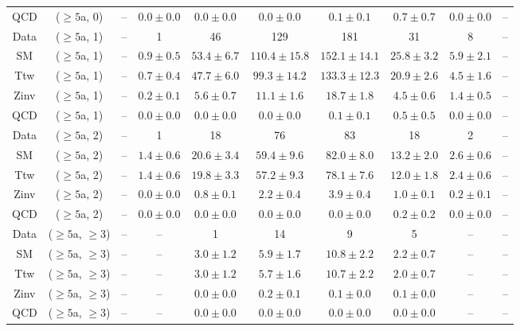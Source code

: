 \begin{table}[h!]
{\begin{tabular}{cccccccccc}
	QCD & ($\ge5$a, 0) & -- & $0.0\pm 0.0$ & $0.0\pm 0.0$ & $0.0\pm 0.0$ & $0.1\pm 0.1$ & $0.7\pm 0.7$ & $0.0\pm 0.0$ & -- \\[0.5ex] 
	Data & ($\ge5$a, 1) & -- & 1 & 46 & 129 & 181 & 31 & 8 & -- \\[0.5ex] 
	SM & ($\ge5$a, 1) & -- & $0.9\pm 0.5$ & $53.4\pm 6.7$ & $110.4\pm 15.8$ & $152.1\pm 14.1$ & $25.8\pm 3.2$ & $5.9\pm 2.1$ & -- \\[0.5ex] 
	Ttw & ($\ge5$a, 1) & -- & $0.7\pm 0.4$ & $47.7\pm 6.0$ & $99.3\pm 14.2$ & $133.3\pm 12.3$ & $20.9\pm 2.6$ & $4.5\pm 1.6$ & -- \\[0.5ex] 
	Zinv & ($\ge5$a, 1) & -- & $0.2\pm 0.1$ & $5.6\pm 0.7$ & $11.1\pm 1.6$ & $18.7\pm 1.8$ & $4.5\pm 0.6$ & $1.4\pm 0.5$ & -- \\[0.5ex] 
	QCD & ($\ge5$a, 1) & -- & $0.0\pm 0.0$ & $0.0\pm 0.0$ & $0.0\pm 0.0$ & $0.1\pm 0.1$ & $0.5\pm 0.5$ & $0.0\pm 0.0$ & -- \\[0.5ex] 
	Data & ($\ge5$a, 2) & -- & 1 & 18 & 76 & 83 & 18 & 2 & -- \\[0.5ex] 
	SM & ($\ge5$a, 2) & -- & $1.4\pm 0.6$ & $20.6\pm 3.4$ & $59.4\pm 9.6$ & $82.0\pm 8.0$ & $13.2\pm 2.0$ & $2.6\pm 0.6$ & -- \\[0.5ex] 
	Ttw & ($\ge5$a, 2) & -- & $1.4\pm 0.6$ & $19.8\pm 3.3$ & $57.2\pm 9.3$ & $78.1\pm 7.6$ & $12.0\pm 1.8$ & $2.4\pm 0.6$ & -- \\[0.5ex] 
	Zinv & ($\ge5$a, 2) & -- & $0.0\pm 0.0$ & $0.8\pm 0.1$ & $2.2\pm 0.4$ & $3.9\pm 0.4$ & $1.0\pm 0.1$ & $0.2\pm 0.1$ & -- \\[0.5ex] 
	QCD & ($\ge5$a, 2) & -- & $0.0\pm 0.0$ & $0.0\pm 0.0$ & $0.0\pm 0.0$ & $0.0\pm 0.0$ & $0.2\pm 0.2$ & $0.0\pm 0.0$ & -- \\[0.5ex] 
	Data & ($\ge5$a, $\ge3$) & -- & -- & 1 & 14 & 9 & 5 & -- & -- \\[0.5ex] 
	SM & ($\ge5$a, $\ge3$) & -- & -- & $3.0\pm 1.2$ & $5.9\pm 1.7$ & $10.8\pm 2.2$ & $2.2\pm 0.7$ & -- & -- \\[0.5ex] 
	Ttw & ($\ge5$a, $\ge3$) & -- & -- & $3.0\pm 1.2$ & $5.7\pm 1.6$ & $10.7\pm 2.2$ & $2.0\pm 0.7$ & -- & -- \\[0.5ex] 
	Zinv & ($\ge5$a, $\ge3$) & -- & -- & $0.0\pm 0.0$ & $0.2\pm 0.1$ & $0.1\pm 0.0$ & $0.1\pm 0.0$ & -- & -- \\[0.5ex] 
	QCD & ($\ge5$a, $\ge3$) & -- & -- & $0.0\pm 0.0$ & $0.0\pm 0.0$ & $0.0\pm 0.0$ & $0.0\pm 0.0$ & -- & -- \\[0.5ex] 
	\hline
	\hline
\end{tabular}}
\end{table}
